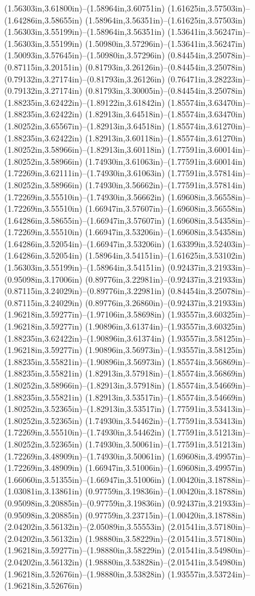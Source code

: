 (1.56303in,3.61800in)--(1.58964in,3.60751in) (1.61625in,3.57503in)--(1.64286in,3.58655in) (1.58964in,3.56351in)--(1.61625in,3.57503in) (1.56303in,3.55199in)--(1.58964in,3.56351in) (1.53641in,3.56247in)--(1.56303in,3.55199in) (1.50980in,3.57296in)--(1.53641in,3.56247in) (1.50093in,3.57645in)--(1.50980in,3.57296in) (0.84454in,3.25078in)--(0.87115in,3.20151in) (0.81793in,3.26126in)--(0.84454in,3.25078in) (0.79132in,3.27174in)--(0.81793in,3.26126in) (0.76471in,3.28223in)--(0.79132in,3.27174in) (0.81793in,3.30005in)--(0.84454in,3.25078in) (1.88235in,3.62422in)--(1.89122in,3.61842in) (1.85574in,3.63470in)--(1.88235in,3.62422in) (1.82913in,3.64518in)--(1.85574in,3.63470in) (1.80252in,3.65567in)--(1.82913in,3.64518in) (1.85574in,3.61270in)--(1.88235in,3.62422in) (1.82913in,3.60118in)--(1.85574in,3.61270in) (1.80252in,3.58966in)--(1.82913in,3.60118in) (1.77591in,3.60014in)--(1.80252in,3.58966in) (1.74930in,3.61063in)--(1.77591in,3.60014in) (1.72269in,3.62111in)--(1.74930in,3.61063in) (1.77591in,3.57814in)--(1.80252in,3.58966in) (1.74930in,3.56662in)--(1.77591in,3.57814in) (1.72269in,3.55510in)--(1.74930in,3.56662in) (1.69608in,3.56558in)--(1.72269in,3.55510in) (1.66947in,3.57607in)--(1.69608in,3.56558in) (1.64286in,3.58655in)--(1.66947in,3.57607in) (1.69608in,3.54358in)--(1.72269in,3.55510in) (1.66947in,3.53206in)--(1.69608in,3.54358in) (1.64286in,3.52054in)--(1.66947in,3.53206in) (1.63399in,3.52403in)--(1.64286in,3.52054in) (1.58964in,3.54151in)--(1.61625in,3.53102in) (1.56303in,3.55199in)--(1.58964in,3.54151in) (0.92437in,3.21933in)--(0.95098in,3.17006in) (0.89776in,3.22981in)--(0.92437in,3.21933in) (0.87115in,3.24029in)--(0.89776in,3.22981in) (0.84454in,3.25078in)--(0.87115in,3.24029in) (0.89776in,3.26860in)--(0.92437in,3.21933in) (1.96218in,3.59277in)--(1.97106in,3.58698in) (1.93557in,3.60325in)--(1.96218in,3.59277in) (1.90896in,3.61374in)--(1.93557in,3.60325in) (1.88235in,3.62422in)--(1.90896in,3.61374in) (1.93557in,3.58125in)--(1.96218in,3.59277in) (1.90896in,3.56973in)--(1.93557in,3.58125in) (1.88235in,3.55821in)--(1.90896in,3.56973in) (1.85574in,3.56869in)--(1.88235in,3.55821in) (1.82913in,3.57918in)--(1.85574in,3.56869in) (1.80252in,3.58966in)--(1.82913in,3.57918in) (1.85574in,3.54669in)--(1.88235in,3.55821in) (1.82913in,3.53517in)--(1.85574in,3.54669in) (1.80252in,3.52365in)--(1.82913in,3.53517in) (1.77591in,3.53413in)--(1.80252in,3.52365in) (1.74930in,3.54462in)--(1.77591in,3.53413in) (1.72269in,3.55510in)--(1.74930in,3.54462in) (1.77591in,3.51213in)--(1.80252in,3.52365in) (1.74930in,3.50061in)--(1.77591in,3.51213in) (1.72269in,3.48909in)--(1.74930in,3.50061in) (1.69608in,3.49957in)--(1.72269in,3.48909in) (1.66947in,3.51006in)--(1.69608in,3.49957in) (1.66060in,3.51355in)--(1.66947in,3.51006in) (1.00420in,3.18788in)--(1.03081in,3.13861in) (0.97759in,3.19836in)--(1.00420in,3.18788in) (0.95098in,3.20885in)--(0.97759in,3.19836in) (0.92437in,3.21933in)--(0.95098in,3.20885in) (0.97759in,3.23715in)--(1.00420in,3.18788in) (2.04202in,3.56132in)--(2.05089in,3.55553in) (2.01541in,3.57180in)--(2.04202in,3.56132in) (1.98880in,3.58229in)--(2.01541in,3.57180in) (1.96218in,3.59277in)--(1.98880in,3.58229in) (2.01541in,3.54980in)--(2.04202in,3.56132in) (1.98880in,3.53828in)--(2.01541in,3.54980in) (1.96218in,3.52676in)--(1.98880in,3.53828in) (1.93557in,3.53724in)--(1.96218in,3.52676in) 